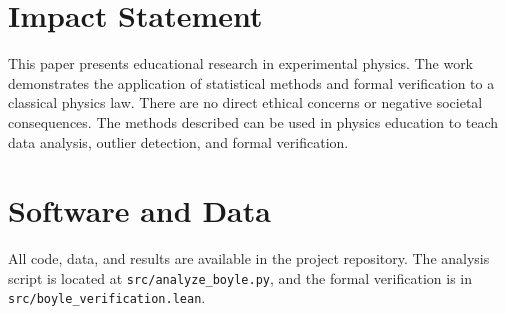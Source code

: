\documentclass{article}
\theoremstyle{plain}
\theoremstyle{definition}
\theoremstyle{remark}
\begin{document}
\section*{Impact Statement}

This paper presents educational research in experimental physics. The work
demonstrates the application of statistical methods and formal verification to
a classical physics law. There are no direct ethical concerns or negative
societal consequences. The methods described can be used in physics education
to teach data analysis, outlier detection, and formal verification.

\section*{Software and Data}

All code, data, and results are available in the project repository.
The analysis script is located at \texttt{src/analyze\_boyle.py}, and the
formal verification is in \texttt{src/boyle\_verification.lean}.



\end{document}
